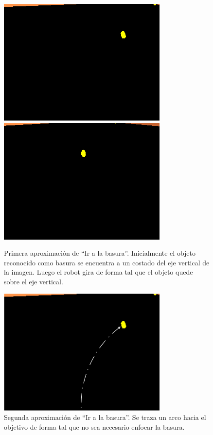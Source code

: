 \begin{figure}[htp]
\begin{center}
\includegraphics[scale=0.5]{comportamientos/figures/basura.png}
\includegraphics[scale=0.5]{comportamientos/figures/basuraenfocada.png}
\caption[Primera aproximaci\'on de ``Ir a la basura'']{Primera aproximaci\'on
		de ``Ir a la basura''. Inicialmente el objeto
		reconocido como basura se encuentra a un costado del eje vertical de
		la imagen. Luego el robot gira de forma tal que el objeto quede sobre
		el eje vertical.}
\label{fig:papproachgoto}
\end{center}
\end{figure}

\begin{figure}[htp]
\begin{center}
\includegraphics[scale=0.5]{comportamientos/figures/basuraAlt.png}
\caption[Segunda aproximaci\'on de ``Ir a la basura'']{Segunda aproximaci\'on de ``Ir a la basura''. Se traza un arco hacia
		el objetivo de forma tal que no sea necesario enfocar la basura.}
\label{fig:sapproachgoto}
\end{center}
\end{figure}

